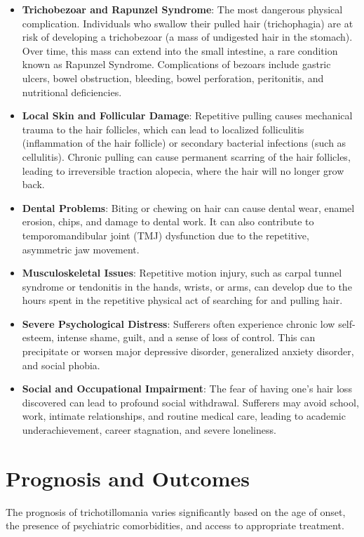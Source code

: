 \begin{itemize}
    \item \textbf{Trichobezoar and Rapunzel Syndrome}: The most dangerous physical complication. Individuals who swallow their pulled hair (trichophagia) are at risk of developing a trichobezoar (a mass of undigested hair in the stomach). Over time, this mass can extend into the small intestine, a rare condition known as Rapunzel Syndrome. Complications of bezoars include gastric ulcers, bowel obstruction, bleeding, bowel perforation, peritonitis, and nutritional deficiencies.
    \item \textbf{Local Skin and Follicular Damage}: Repetitive pulling causes mechanical trauma to the hair follicles, which can lead to localized folliculitis (inflammation of the hair follicle) or secondary bacterial infections (such as cellulitis). Chronic pulling can cause permanent scarring of the hair follicles, leading to irreversible traction alopecia, where the hair will no longer grow back.
    \item \textbf{Dental Problems}: Biting or chewing on hair can cause dental wear, enamel erosion, chips, and damage to dental work. It can also contribute to temporomandibular joint (TMJ) dysfunction due to the repetitive, asymmetric jaw movement.
    \item \textbf{Musculoskeletal Issues}: Repetitive motion injury, such as carpal tunnel syndrome or tendonitis in the hands, wrists, or arms, can develop due to the hours spent in the repetitive physical act of searching for and pulling hair.
    \item \textbf{Severe Psychological Distress}: Sufferers often experience chronic low self-esteem, intense shame, guilt, and a sense of loss of control. This can precipitate or worsen major depressive disorder, generalized anxiety disorder, and social phobia.
    \item \textbf{Social and Occupational Impairment}: The fear of having one's hair loss discovered can lead to profound social withdrawal. Sufferers may avoid school, work, intimate relationships, and routine medical care, leading to academic underachievement, career stagnation, and severe loneliness.
\end{itemize}

\section*{Prognosis and Outcomes}
The prognosis of trichotillomania varies significantly based on the age of onset, the presence of psychiatric comorbidities, and access to appropriate treatment.

